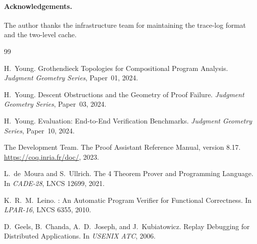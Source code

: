 \documentclass[11pt]{article}
\begin{document}
\paragraph{Acknowledgements.}
The author thanks the \JuGeo{} infrastructure team for maintaining the
trace-log format and the two-level cache.

\begin{thebibliography}{99}

H.~Young.
\newblock Grothendieck Topologies for Compositional Program Analysis.
\newblock \emph{Judgment Geometry Series}, Paper~01, 2024.

H.~Young.
\newblock Descent Obstructions and the Geometry of Proof Failure.
\newblock \emph{Judgment Geometry Series}, Paper~03, 2024.

H.~Young.
\newblock Evaluation: End-to-End Verification Benchmarks.
\newblock \emph{Judgment Geometry Series}, Paper~10, 2024.

The \Coq{} Development Team.
\newblock The \Coq{} Proof Assistant Reference Manual, version 8.17.
\newblock \url{https://coq.inria.fr/doc/}, 2023.

L.~de~Moura and S.~Ullrich.
\newblock The \LEAN{} 4 Theorem Prover and Programming Language.
\newblock In \emph{CADE-28}, LNCS 12699, 2021.

K.~R.~M.~Leino.
\newblock \Dafny: An Automatic Program Verifier for Functional Correctness.
\newblock In \emph{LPAR-16}, LNCS 6355, 2010.

D.~Geels, B.~Chanda, A.~D.~Joseph, and J.~Kubiatowicz.
\newblock Replay Debugging for Distributed Applications.
\newblock In \emph{USENIX ATC}, 2006.

\end{thebibliography}
\end{document}
